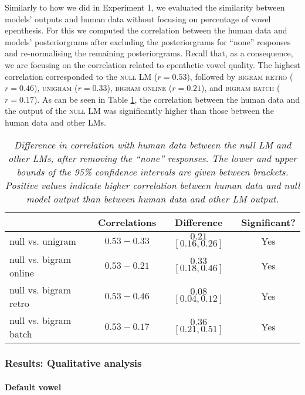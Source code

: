 {Similarly to how we did in Experiment 1, we evaluated the similarity between models' outputs and human data without focusing on percentage of vowel epenthesis. For this we computed the correlation between the human data and models' posteriorgrams after excluding the posteriorgrams for ``none'' responses and re-normalising the remaining posteriorgrams. Recall that, as a consequence, we are focusing on the correlation related to epenthetic vowel quality. The highest correlation corresponded to the \textsc{null} LM ($r = 0.53$), followed by \textsc{bigram retro} ($r = 0.46$), \textsc{unigram} ($r = 0.33$), \textsc{bigram online} ($r = 0.21$), and \textsc{bigram batch} ($r = 0.17$). 
As can be seen in Table \ref{tab:parlato_lms-cor_diff-nonone}, the correlation between the human data and the output of the \textsc{null} LM was significantly higher than those between the human data and other LMs. 

\begin{table}[ht]
\centering
\caption{\textit{Difference in correlation with human data between the null LM and other LMs, after removing the ``none'' responses. The lower and upper bounds of the 95\% confidence intervals are given between brackets. Positive values indicate higher correlation between human data and null model output than between human data and other LM output.}}
\label{tab:parlato_lms-cor_diff-nonone}
\vspace{0.25cm}
\begin{tabular}{lccc}
   \toprule
  & Correlations & Difference & Significant? \\  \midrule
null vs. unigram & $0.53 - 0.33$ & $0.21$ $[0.16, 0.26]$ & Yes  \\ 
null vs. bigram online   & $0.53 - 0.21$ & $0.33$ $[0.18, 0.46]$ & Yes \\ 
null vs. bigram retro    & $0.53 - 0.46$ & $0.08$ $[0.04, 0.12]$ & Yes \\ 
 null vs. bigram batch    & $0.53 - 0.17$ & $0.36$ $[0.21, 0.51]$ & Yes \\  \bottomrule 
\end{tabular}
\end{table}

\subsubsection{Results: Qualitative analysis}

\paragraph{Default vowel}

}
